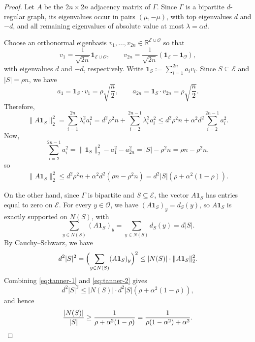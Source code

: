 \documentclass[10pt,a4paper]{amsart}
\newcommand{\cE}{\mathcal{E} }
\newcommand{\cO}{\mathcal{O} }
\begin{document}
\begin{proof}
Let $A$ be the $2n \times 2n$ adjacency matrix of $\Gamma$. Since $\Gamma$ is a bipartite $d$-regular graph, its eigenvalues occur in pairs $(\mu,-\mu)$, with top eigenvalues $d$ and $-d$, and all remaining eigenvalues of absolute value at most $\lambda=\alpha d$.

Choose an orthonormal eigenbasis $v_1,\dots,v_{2n} \in \mathbb R^{\cE\cup \cO}$ so that
\[
v_1=\frac{1}{\sqrt{2n}}\mathbf 1_{\cE\cup \cO},
\qquad
v_{2n}=\frac{1}{\sqrt{2n}}(\mathbf 1_{\cE}-\mathbf 1_{\cO}),
\]
with eigenvalues $d$ and $-d$, respectively. Write $\mathbf 1_S:=\sum_{i=1}^{2n} a_i v_i$. 
Since $S\subseteq \cE$ and $|S|=\rho n$, we have
\[
a_1=\mathbf 1_S\cdot v_1=\rho\sqrt{\frac{n}{2}},
\qquad
a_{2n}=\mathbf 1_S\cdot v_{2n}=\rho\sqrt{\frac{n}{2}}.
\]
Therefore,
\[
\|A\mathbf 1_S\|_2^2
=
\sum_{i=1}^{2n}\lambda_i^2 a_i^2
=
d^2\rho^2 n+\sum_{i=2}^{2n-1}\lambda_i^2 a_i^2
\le
d^2\rho^2 n+\alpha^2 d^2\sum_{i=2}^{2n-1} a_i^2.
\]
Now,
\[
\sum_{i=2}^{2n-1}a_i^2
=
\|\mathbf 1_S\|_2^2-a_1^2-a_{2n}^2
=
|S|-\rho^2 n
=
\rho n-\rho^2 n,
\]
so
\begin{align}\label{eq:tanner-1}
    \|A\mathbf 1_S\|_2^2
\le
d^2\rho^2 n+\alpha^2 d^2(\rho n-\rho^2 n)
=
d^2 |S|(\rho+\alpha^2(1-\rho)).
\end{align}

On the other hand, since $\Gamma$ is bipartite and $S\subseteq \cE$, the vector $A\mathbf 1_S$ has entries equal to zero on $\cE$. For every $y\in \cO$, we have $(A\mathbf 1_S)_y=d_S(y)$,
so $A\mathbf 1_S$ is exactly supported on $N(S)$, with
\[
\sum_{y\in N(S)} (A\mathbf 1_S)_y=\sum_{y\in N(S)}d_S(y)=d|S|.
\]
By Cauchy--Schwarz, we have
\begin{align}\label{eq:tanner-2}
    d^2|S|^2
=
\Bigl(\sum_{y\in N(S)} (A\mathbf 1_S)_y\Bigr)^2
\le
|N(S)|\cdot \|A\mathbf 1_S\|_2^2.
\end{align}
Combining \eqref{eq:tanner-1} and \eqref{eq:tanner-2} gives
\[
d^2|S|^2
\le
|N(S)|\cdot d^2|S|(\rho+\alpha^2(1-\rho)),
\]
and hence
\[
\frac{|N(S)|}{|S|}
\ge
\frac{1}{\rho+\alpha^2(1-\rho)}
=
\frac{1}{\rho(1-\alpha^2)+\alpha^2}.
\qedhere
\]
\end{proof}
\end{document}
